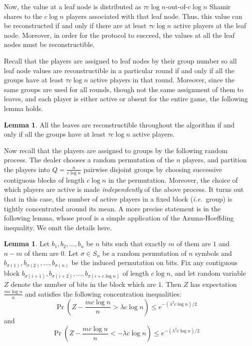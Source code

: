 \documentclass[12pt]{article}
\theoremstyle{definition}
\newtheorem{lemma}[theorem]{Lemma}
\newcommand{\ie}{\emph{i.e.}}
\begin{document}
Now, the value at a leaf node is distributed as $\tau c\log
n$-out-of-$c\log n$ Shamir shares to the $c\log n$ players associated
with that leaf node. Thus, this value can be reconstructed if and only
if there are at least $\tau c\log n$ active players at the leaf
node. Moreover, in order for the protocol to succeed, the values at
all the leaf nodes must be reconstructible.

Recall that the players are assigned to leaf nodes by their group number 
so all leaf node values are reconstructible in a particular round if and 
only if all the groups 
have  at least $\tau c\log n$ active players in that round. Moreover, 
since the same groups are used for all rounds, though not the same 
assignment of them to leaves, and each player is either active or absent for 
the entire game, the following lemma holds.
\begin{lemma}\label{lem:lriffg}
All the leaves are reconstructible throughout the algorithm if and only if 
all the groups have  at least $\tau c\log n$ active players.
\end{lemma}

Now recall that the players are assigned to groups by the 
following random process.  The dealer chooses a random permutation of the $n$
players, and partition the players into $Q= \frac{n}{c\log n}$ 
pairwise disjoint groups by choosing successive contiguous blocks of 
length $c\log n$ in the permutation. Moreover, the choice of which 
players are active is made \emph{independently} of the above process. 
It turns out that in this case, the number of active players in a 
fixed block (\ie \, group) is tightly
concentrated around its mean. A more precise statement is in the
following lemma, whose proof is a simple application of the Azuma-Hoeffding
inequality. We omit the details here.

\begin{lemma}\label{lem:conc}
Let $b_1,b_2, \dots, b_n$ be $n$ bits such that exactly $m$ of them
are $1$ and $n-m$ of them are $0$. Let $\sigma \in S_n$ be a random
permutation of $n$ symbols and $b_{\sigma(1)},b_{\sigma(2)}, \dots,
b_{\sigma(n)}$ be the induced permutation on bits. Fix any
contiguous block $b_{\sigma(i+1)},b_{\sigma(i+2)}, \dots, b_{\sigma(i+
  c\log n)}$ of length $c\log n$, and let random variable $Z$ denote 
the number of bits in the block which are $1$. 
Then $Z$ has expectation $\frac{mc\log n}{n} $ and satisfies the following 
concentration inequalities:
\[
\Pr\left(Z- \frac{mc\log n}{n} > \lambda c\log n\right) \le
e^{-(\lambda^2 c\log n)/2}
\]
and
\[
\Pr\left(Z- \frac{mc\log n}{n} < -\lambda c\log n\right) \le
e^{-(\lambda^2 c\log n)/2}
\]
\end{lemma}
\end{document}
